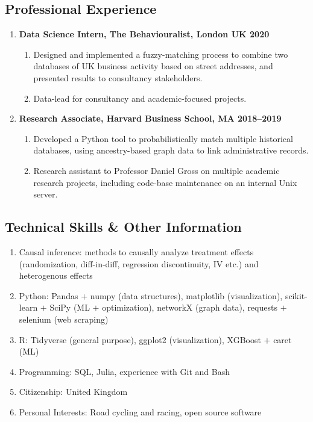 \documentclass[letterpaper,11pt,oneside]{article}
\begin{document}
\subsection*{Professional Experience}
\begin{enumerate}[itemsep=2.5pt, label={}, leftmargin=0pt]
    \item \textbf{Data Science Intern, The Behaviouralist, London UK \hfill 2020}
    \begin{enumerate}[itemsep=0pt, label={\textbf{--}}, leftmargin=12pt]
        \item Designed and implemented a fuzzy-matching process to combine two databases of UK business activity based on street addresses, and presented results to consultancy stakeholders.
        \item Data-lead for consultancy and academic-focused projects.
    \end{enumerate}
    
    \item \textbf{Research Associate, Harvard Business School, MA \hfill 2018--2019}
    \begin{enumerate}[itemsep=0pt, label={\textbf{--}}, leftmargin=12pt]
        \item Developed a Python tool to probabilistically match multiple historical databases, using ancestry-based graph data to link administrative records.
        \item Research assistant to Professor Daniel Gross on multiple academic research projects, including code-base maintenance on an internal Unix server.
    \end{enumerate}
\end{enumerate}
    
\subsection*{Technical Skills \& Other Information}
\begin{enumerate}[itemsep=0pt, label={\textbf{--}}, leftmargin=12pt]
    \item Causal inference: methods to causally analyze treatment effects
    (randomization, diff-in-diff, regression discontinuity, IV etc.) and heterogenous effects
    \item Python: Pandas $+$ numpy (data structures), matplotlib (visualization), scikit-learn $+$ SciPy (ML $+$ optimization), networkX (graph data), requests $+$ selenium (web scraping)
    \item R: Tidyverse (general purpose), ggplot2 (visualization), XGBoost $+$ caret (ML)
    \item Programming: SQL, Julia,  experience with Git and Bash
    \item Citizenship: United Kingdom %
    \item Personal Interests: Road cycling and racing, open source software
\end{enumerate}
\end{document}
